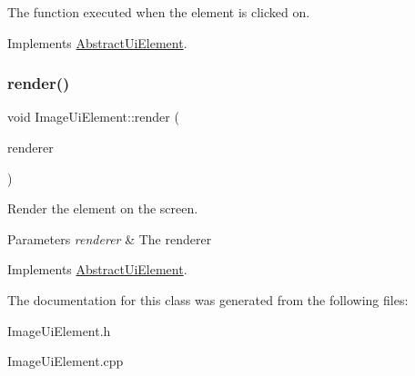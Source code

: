 The function executed when the element is clicked on. 



Implements \mbox{\hyperlink{class_abstract_ui_element_a42296c15c9e70b6ac7fda0b1862612af}{Abstract\+Ui\+Element}}.

\mbox{\label{class_image_ui_element_a422fc1d3b4c1451f656e7470e575577b}} 
\subsubsection{\texorpdfstring{render()}{render()}}
{\footnotesize\ttfamily void Image\+Ui\+Element\+::render (\begin{DoxyParamCaption}\item[{S\+D\+L\+\_\+\+Renderer $\ast$}]{renderer }\end{DoxyParamCaption})\hspace{0.3cm}{\ttfamily [virtual]}}



Render the element on the screen. 


\begin{DoxyParams}{Parameters}
{\em renderer} & The renderer\\
\hline
\end{DoxyParams}


Implements \mbox{\hyperlink{class_abstract_ui_element_afacedc89a5805d95d3bdcf20619b1c06}{Abstract\+Ui\+Element}}.



The documentation for this class was generated from the following files\+:\begin{DoxyCompactItemize}
\item 
Image\+Ui\+Element.\+h\item 
Image\+Ui\+Element.\+cpp\end{DoxyCompactItemize}
